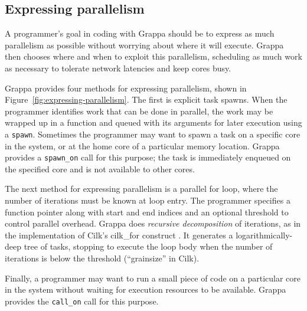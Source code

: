 \subsection{Expressing parallelism}

A programmer's goal in coding with Grappa should be to express as much
parallelism as possible without worrying about where it will execute.
Grappa then chooses where and when to exploit this parallelism,
scheduling as much work as necessary to tolerate network latencies and
keep cores busy. 

Grappa provides four methods for expressing parallelism, shown in
Figure~\ref{fig:expressing-parallelism}. The first is explicit task
spawns. When the programmer identifies work that can be done in
parallel, the work may be wrapped up in a function and queued with its
arguments for later execution using a \texttt{spawn}. Sometimes the
programmer may want to spawn a task on a specific core in the system,
or at the home core of a particular memory location. Grappa provides a
\texttt{spawn\_on} call for this purpose; the task is immediately
enqueued on the specified core and is not available to other cores.

The next method for expressing parallelism is a parallel for loop, where the
number of iterations must be known at loop entry. The programmer specifies a
function pointer along with start and end indices and an optional threshold to
control parallel overhead. Grappa does {\em recursive decomposition} of
iterations, as in the implementation of Cilk's cilk\_for construct .
It generates a logarithmically-deep tree of tasks, stopping to execute the
loop body when the number of iterations is below the threshold (``grainsize''
in Cilk). 

Finally, a programmer may want to run a small piece of code on a
particular core in the system without waiting for execution resources
to be available. Grappa provides the \texttt{call\_on} call for this
purpose.

